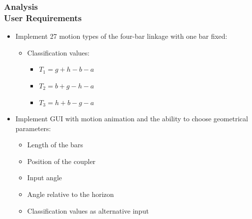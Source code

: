 \documentclass[ucs,10pt]{beamer}
\begin{document}
\begin{frame}
\frametitle{Analysis \\
	\small \color{rwth-blue} User Requirements}
	  \begin{minipage}{\linewidth}
		\centering
		\begin{minipage}{0.6\linewidth}
			\begin{itemize}
				\item Implement 27 motion types of the four-bar linkage with one bar fixed:
				\begin{itemize}
					\item Classification values:
					\begin{itemize}
						\item $T_1 = g + h - b - a$
						\item $T_2 = b + g - h - a$
						\item $T_3 = h + b - g - a$
					\end{itemize}
				\end{itemize}
				\item Implement GUI with motion animation and the ability to choose geometrical parameters:
				\begin{itemize}
					\item Length of the bars
					\item Position of the coupler
					\item Input angle
					\item Angle relative to the horizon
					\item Classification values as alternative input
				\end{itemize}
			\end{itemize}
		\end{minipage}
		\hspace{0.05\linewidth}
		\begin{minipage}{0.32\linewidth}
			\begin{figure}[h]

\end{figure}
\end{minipage}
\end{minipage}
\end{frame}
\end{document}
